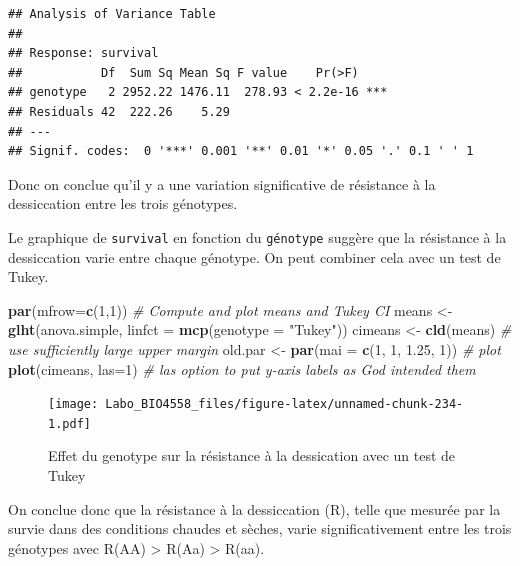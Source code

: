 \documentclass[12pt,]{book}
\newenvironment{Shaded}{\begin{snugshade}}{\end{snugshade}}
\newcommand{\CommentTok}[1]{\textcolor[rgb]{0.56,0.35,0.01}{\textit{#1}}}
\newcommand{\DataTypeTok}[1]{\textcolor[rgb]{0.13,0.29,0.53}{#1}}
\newcommand{\DecValTok}[1]{\textcolor[rgb]{0.00,0.00,0.81}{#1}}
\newcommand{\FloatTok}[1]{\textcolor[rgb]{0.00,0.00,0.81}{#1}}
\newcommand{\KeywordTok}[1]{\textcolor[rgb]{0.13,0.29,0.53}{\textbf{#1}}}
\newcommand{\NormalTok}[1]{#1}
\newcommand{\StringTok}[1]{\textcolor[rgb]{0.31,0.60,0.02}{#1}}
\begin{document}
\begin{verbatim}
## Analysis of Variance Table
## 
## Response: survival
##           Df  Sum Sq Mean Sq F value    Pr(>F)    
## genotype   2 2952.22 1476.11  278.93 < 2.2e-16 ***
## Residuals 42  222.26    5.29                      
## ---
## Signif. codes:  0 '***' 0.001 '**' 0.01 '*' 0.05 '.' 0.1 ' ' 1
\end{verbatim}

Donc on conclue qu'il y a une variation significative de résistance à la dessiccation entre les trois génotypes.

Le graphique de \texttt{survival} en fonction du \texttt{génotype} suggère que la résistance à la dessiccation varie entre chaque génotype. On peut combiner cela avec un test de Tukey.

\begin{Shaded}
\begin{Highlighting}[]
\KeywordTok{par}\NormalTok{(}\DataTypeTok{mfrow=}\KeywordTok{c}\NormalTok{(}\DecValTok{1}\NormalTok{,}\DecValTok{1}\NormalTok{))}
\CommentTok{# Compute and plot means and Tukey CI}
\NormalTok{means <-}\StringTok{ }\KeywordTok{glht}\NormalTok{(anova.simple, }\DataTypeTok{linfct =} \KeywordTok{mcp}\NormalTok{(}\DataTypeTok{genotype =}
  \StringTok{"Tukey"}\NormalTok{))}
\NormalTok{cimeans <-}\StringTok{ }\KeywordTok{cld}\NormalTok{(means)}
\CommentTok{# use sufficiently large upper margin}
\NormalTok{old.par <-}\StringTok{ }\KeywordTok{par}\NormalTok{(}\DataTypeTok{mai =} \KeywordTok{c}\NormalTok{(}\DecValTok{1}\NormalTok{, }\DecValTok{1}\NormalTok{, }\FloatTok{1.25}\NormalTok{, }\DecValTok{1}\NormalTok{))}
\CommentTok{# plot}
\KeywordTok{plot}\NormalTok{(cimeans, }\DataTypeTok{las=}\DecValTok{1}\NormalTok{) }\CommentTok{# las option to put y-axis labels as God intended them}
\end{Highlighting}
\end{Shaded}

\begin{figure}
\centering
\texttt{[image: Labo\_BIO4558\_files/figure-latex/unnamed-chunk-234-1.pdf]}
\caption{\label{fig:unnamed-chunk-234}Effet du genotype sur la résistance à la dessication avec un test de Tukey}
\end{figure}

On conclue donc que la résistance à la dessiccation (R), telle que mesurée par la survie dans des conditions chaudes et sèches, varie significativement entre les trois génotypes avec R(AA) \textgreater{} R(Aa) \textgreater{} R(aa).
\end{document}
